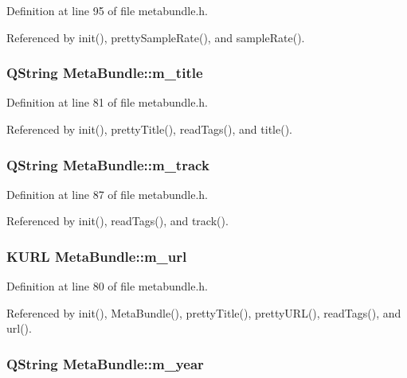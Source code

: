Definition at line 95 of file metabundle.h.

Referenced by init(), pretty\-Sample\-Rate(), and sample\-Rate().
\subsubsection{\setlength{\rightskip}{0pt plus 5cm}QString {\bf Meta\-Bundle::m\_\-title}\hspace{0.3cm}{\tt  [private]}}\label{classMetaBundle_MetaBundler1}




Definition at line 81 of file metabundle.h.

Referenced by init(), pretty\-Title(), read\-Tags(), and title().
\subsubsection{\setlength{\rightskip}{0pt plus 5cm}QString {\bf Meta\-Bundle::m\_\-track}\hspace{0.3cm}{\tt  [private]}}\label{classMetaBundle_MetaBundler7}




Definition at line 87 of file metabundle.h.

Referenced by init(), read\-Tags(), and track().
\subsubsection{\setlength{\rightskip}{0pt plus 5cm}KURL {\bf Meta\-Bundle::m\_\-url}\hspace{0.3cm}{\tt  [private]}}\label{classMetaBundle_MetaBundler0}




Definition at line 80 of file metabundle.h.

Referenced by init(), Meta\-Bundle(), pretty\-Title(), pretty\-URL(), read\-Tags(), and url().
\subsubsection{\setlength{\rightskip}{0pt plus 5cm}QString {\bf Meta\-Bundle::m\_\-year}\hspace{0.3cm}{\tt  [private]}}\label{classMetaBundle_MetaBundler4}




